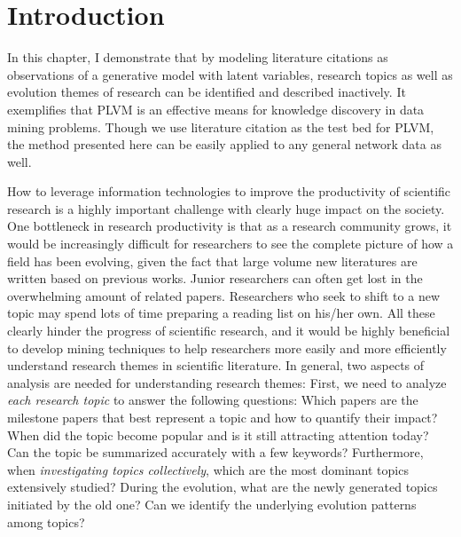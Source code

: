 \section{Introduction}

In this chapter, I demonstrate that by modeling literature citations as
observations of a generative model with latent variables, research topics as
well as evolution themes of research can be identified and described inactively.
It exemplifies that PLVM is an effective means for knowledge discovery in data
mining problems. Though we use literature citation as the test bed for PLVM, the
method presented here can be easily applied to any general network data as well.

How to leverage information technologies to improve the  productivity of
scientific research is a highly important challenge with clearly huge impact on
the society. One bottleneck in research productivity is that as a research
community grows, it would be increasingly difficult for researchers to see the
complete picture of how a field has been evolving, given the fact that large
volume new literatures are written based on previous works. Junior researchers
can often get lost in the overwhelming amount of related papers. Researchers who
seek to shift to a new topic may spend lots of time preparing a reading list on
his/her own. All these clearly hinder the progress of scientific research, and
it would be highly beneficial to develop mining techniques to help researchers
more easily and more efficiently  understand research themes in scientific
literature.  In general, two aspects of analysis are needed for understanding
research themes: First, we need to analyze \emph{each research topic} to answer
the following questions: Which papers are the milestone papers that best
represent a topic and how to quantify their impact?  When did the topic become
popular and is it still attracting attention today?  Can the topic be summarized
accurately with a few keywords?  Furthermore, when \emph{investigating topics
collectively}, which are the most dominant topics extensively studied?  During
the evolution, what are the newly generated topics initiated by the old one?
Can we identify the underlying evolution patterns among topics?

